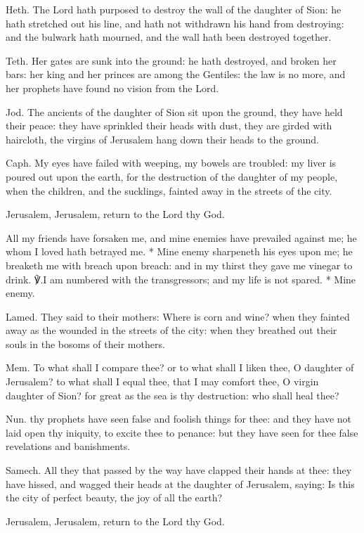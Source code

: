 \documentclass[12pt]{book}
\begin{document}
\silently

\newpage
\altlarge
{}
\altitshape

\begin{enpars}
Heth. The Lord hath purposed to destroy the wall of the daughter of Sion: he hath stretched out his line, and hath not withdrawn his hand from destroying: and the bulwark hath mourned, and the wall hath been destroyed together.

Teth. Her gates are sunk into the ground: he hath destroyed, and broken her bars: her king and her princes are among the Gentiles: the law is no more, and her prophets have found no vision from the Lord.

Jod. The ancients of the daughter of Sion sit upon the ground, they have held their peace: they have sprinkled their heads with dust, they are girded with haircloth, the virgins of Jerusalem hang down their heads to the ground.

Caph. My eyes have failed with weeping, my bowels are troubled: my liver is poured out upon the earth, for the destruction of the daughter of my people, when the children, and the sucklings, fainted away in the streets of the city.

Jerusalem, Jerusalem, return to the Lord thy God.
\end{enpars}


\begin{enpars}
All my friends have forsaken me, and mine enemies have prevailed against me; he whom I loved hath betrayed me.
* Mine enemy sharpeneth his eyes upon me; he breaketh me with breach upon breach: and in my thirst they gave me vinegar to drink.
℣.\@  I am numbered with the transgressors; and my life is not spared.
* Mine enemy.
\end{enpars}

\begin{enpars}
Lamed. They said to their mothers: Where is corn and wine? when they fainted away as the wounded in the streets of the city: when they breathed out their souls in the bosoms of their mothers.

Mem. To what shall I compare thee? or to what shall I liken thee, O daughter of Jerusalem? to what shall I equal thee, that I may comfort thee, O virgin daughter of Sion? for great as the sea is thy destruction: who shall heal thee?

Nun. thy prophets have seen false and foolish things for thee: and they have not laid open thy iniquity, to excite thee to penance: but they have seen for thee false revelations and banishments.

Samech. All they that passed by the way have clapped their hands at thee: they have hissed, and wagged their heads at the daughter of Jerusalem, saying: Is this the city of perfect beauty, the joy of all the earth?

Jerusalem, Jerusalem, return to the Lord thy God.
\end{enpars}
\end{document}
